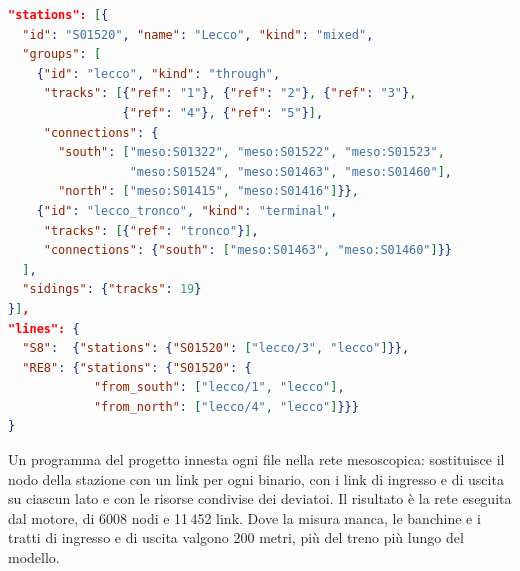 \begin{lstlisting}[language=json,caption={Parte della descrizione della stazione di Lecco.},label={lst:nodo-lecco}]
"stations": [{
  "id": "S01520", "name": "Lecco", "kind": "mixed",
  "groups": [
    {"id": "lecco", "kind": "through",
     "tracks": [{"ref": "1"}, {"ref": "2"}, {"ref": "3"},
                {"ref": "4"}, {"ref": "5"}],
     "connections": {
       "south": ["meso:S01322", "meso:S01522", "meso:S01523",
                 "meso:S01524", "meso:S01463", "meso:S01460"],
       "north": ["meso:S01415", "meso:S01416"]}},
    {"id": "lecco_tronco", "kind": "terminal",
     "tracks": [{"ref": "tronco"}],
     "connections": {"south": ["meso:S01463", "meso:S01460"]}}
  ],
  "sidings": {"tracks": 19}
}],
"lines": {
  "S8":  {"stations": {"S01520": ["lecco/3", "lecco"]}},
  "RE8": {"stations": {"S01520": {
            "from_south": ["lecco/1", "lecco"],
            "from_north": ["lecco/4", "lecco"]}}}
}
\end{lstlisting}

Un programma del progetto innesta ogni file nella rete mesoscopica: sostituisce il nodo della stazione con un link per ogni binario, con i link di ingresso e di uscita su ciascun lato e con le risorse condivise dei deviatoi. Il risultato è la rete eseguita dal motore, di 6008 nodi e 11\,452 link. Dove la misura manca, le banchine e i tratti di ingresso e di uscita valgono 200 metri, più del treno più lungo del modello.